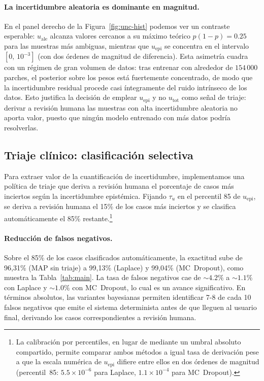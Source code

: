 \documentclass{article}
\begin{document}
\paragraph{La incertidumbre aleatoria es dominante en magnitud.}
En el panel derecho de la Figura~\ref{fig:unc-hist} podemos ver un contraste
esperable: $u_{\mathrm{ale}}$ alcanza valores cercanos a su m\'aximo
te\'orico $p(1\!-\!p)=0{.}25$ para las muestras m\'as ambiguas,
mientras que $u_{\mathrm{epi}}$ se concentra en el intervalo $[0,\,10^{-3}]$ (con dos
\'ordenes de magnitud de diferencia). Esta asimetr\'ia cuadra con
un r\'egimen de gran volumen de datos: tras entrenar con alrededor de $154\,000$
parches, el posterior sobre los pesos est\'a fuertemente concentrado,
de modo que la incertidumbre residual procede casi \'integramente del
ruido intr\'inseco de los datos. Esto justifica la decisi\'on
de emplear $u_{\mathrm{epi}}$ y no $u_{\mathrm{tot}}$ como se\~nal de
triaje: derivar a revisi\'on humana las muestras con alta incertidumbre
aleatoria no aporta valor, puesto que ning\'un modelo entrenado con
m\'as datos podr\'ia resolverlas. 

\subsection{Triaje cl\'inico: clasificación selectiva}
\label{sec:triage}

Para extraer valor de la cuantificación de incertidumbre, implementamos una política de
triaje que deriva a revisión humana el porcentaje de casos más inciertos
según la incertidumbre epistémica.
Fijando \(\tau_u\) en el percentil 85 de \(u_{\mathrm{epi}}\), se deriva
a revisión humana el 15\% de los casos más inciertos y se clasifica
automáticamente el 85\% restante.\footnote{La calibración por percentiles,
en lugar de mediante un umbral absoluto compartido, permite comparar ambos
métodos a igual tasa de derivación pese a que la escala numérica de
\(u_{\mathrm{epi}}\) difiere entre ellos en dos órdenes de magnitud
(percentil~85: \(5{.}5\times10^{-6}\) para Laplace,
\(1{.}1\times10^{-4}\) para MC~Dropout).}

\paragraph{Reducción de falsos negativos.}
Sobre el 85\% de los casos clasificados automáticamente, la exactitud sube
de 96,31\% (MAP sin triaje) a 99,13\% (Laplace) y 99,04\% (MC~Dropout), como muestra la Tabla~\ref{tab:main}. 
La tasa de falsos negativos
cae de \(\sim\!4{.}2\%\) a \(\sim\!1{.}1\%\) con Laplace y
\(\sim\!1{.}0\%\) con MC~Dropout, lo cual es un avance significativo. En términos absolutos, 
las variantes bayesianas permiten identificar 7-8 de cada 10 falsos negativos que emite el
sistema determinista antes de que lleguen al usuario final, derivando los
casos correspondientes a revisión humana.
\end{document}

